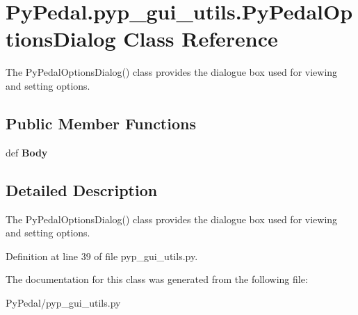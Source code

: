\hypertarget{classPyPedal_1_1pyp__gui__utils_1_1PyPedalOptionsDialog}{
\section{PyPedal.pyp\_\-gui\_\-utils.PyPedalOptionsDialog Class Reference}
\label{classPyPedal_1_1pyp__gui__utils_1_1PyPedalOptionsDialog}
}


The PyPedalOptionsDialog() class provides the dialogue box used for viewing and setting options.  


\subsection*{Public Member Functions}
\begin{DoxyCompactItemize}
\item 
\hypertarget{classPyPedal_1_1pyp__gui__utils_1_1PyPedalOptionsDialog_aa77b1d9fbe370704c47fe2034e23b153}{
def {\bfseries Body}}
\label{classPyPedal_1_1pyp__gui__utils_1_1PyPedalOptionsDialog_aa77b1d9fbe370704c47fe2034e23b153}

\end{DoxyCompactItemize}


\subsection{Detailed Description}
The PyPedalOptionsDialog() class provides the dialogue box used for viewing and setting options. 



Definition at line 39 of file pyp\_\-gui\_\-utils.py.



The documentation for this class was generated from the following file:\begin{DoxyCompactItemize}
\item 
PyPedal/pyp\_\-gui\_\-utils.py\end{DoxyCompactItemize}

